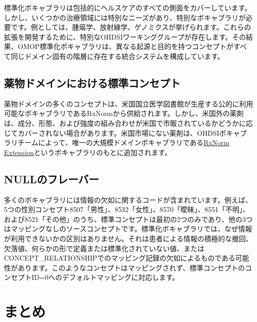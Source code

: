 \documentclass[
  11pt]{book}
\theoremstyle{definition}
\theoremstyle{definition}
\theoremstyle{definition}
\theoremstyle{definition}
\theoremstyle{remark}
\begin{document}
標準化ボキャブラリは包括的にヘルスケアのすべての側面をカバーしています。しかし、いくつかの治療領域には特別なニーズがあり、特別なボキャブラリが必要です。例としては、腫瘍学、放射線学、ゲノミクスが挙げられます。これらの拡張を開発するために、特別なOHDSIワーキンググループが存在します。その結果、OMOP標準化ボキャブラリは、異なる起源と目的を持つコンセプトがすべて同じドメイン固有の階層に存在する統合システムを構成しています。

\subsection{薬物ドメインにおける標準コンセプト}\label{rxNormExtension}

薬物ドメインの多くのコンセプトは、米国国立医学図書館が生産する公的に利用可能なボキャブラリであるRxNormから供給されます。しかし、米国外の薬剤は、成分、形態、および強度の組み合わせが米国で市販されているかどうかに応じてカバーされない場合があります。米国市場にない薬剤は、OHDSIボキャブラリチームによって、唯一の大規模ドメインボキャブラリである\href{https://www.ohdsi.org/web/wiki/doku.php?id=documentation:vocabulary:rxnorm_extension}{RxNorm Extension}というボキャブラリのもとに追加されます。

\subsection{NULLのフレーバー}\label{nullux306eux30d5ux30ecux30fcux30d0ux30fc}

多くのボキャブラリには情報の欠如に関するコードが含まれています。例えば、5つの性別コンセプト8507「男性」、8532「女性」、8570「曖昧」、8551「不明」、および8521「その他」のうち、標準コンセプトは最初の2つのみであり、他の3つはマッピングなしのソースコンセプトです。標準化ボキャブラリでは、なぜ情報が利用できないかの区別はありません。それは患者による情報の積極的な撤回、欠落値、何らかの形で定義または標準化されていない値、またはCONCEPT\_RELATIONSHIPでのマッピング記録の欠如によるものである可能性があります。このようなコンセプトはマッピングされず、標準コンセプトのコンセプトID=0へのデフォルトマッピングに対応します。

\section{まとめ}\label{ux307eux3068ux3081-3}
\end{document}
